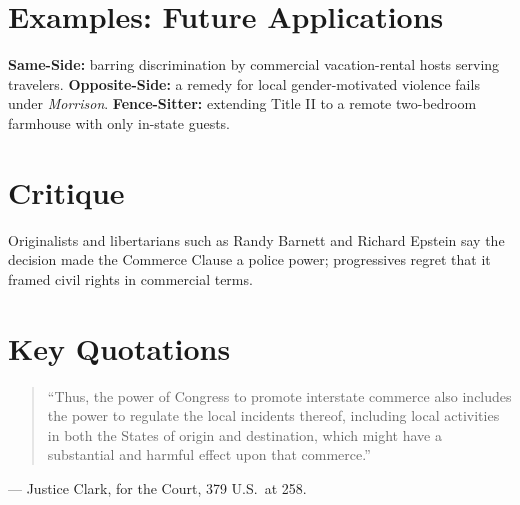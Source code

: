 \documentclass[12pt]{article}
\begin{document}
\section{Examples: Future Applications}
\textbf{Same-Side:} barring discrimination by commercial vacation-rental hosts serving travelers. \textbf{Opposite-Side:} a remedy for local gender-motivated violence fails under \textit{Morrison}. \textbf{Fence-Sitter:} extending Title II to a remote two-bedroom farmhouse with only in-state guests.

\section{Critique}
Originalists and libertarians such as Randy Barnett and Richard Epstein say the decision made the Commerce Clause a police power; progressives regret that it framed civil rights in commercial terms.

\section{Key Quotations}
\begin{quote}
``Thus, the power of Congress to promote interstate commerce also includes the power to regulate the local incidents thereof, including local activities in both the States of origin and destination, which might have a substantial and harmful effect upon that commerce.''
\end{quote}
\noindent --- Justice Clark, for the Court, 379 U.S.\ at 258.
\end{document}
